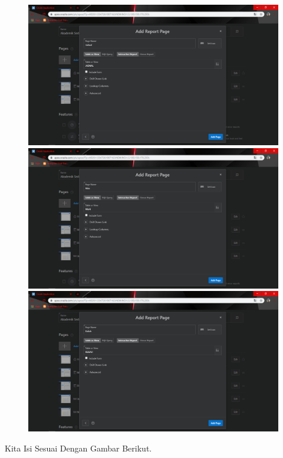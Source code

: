 \begin{enumerate}
\begin{figure}[!htbp]
    \begin{center}
    \includegraphics[scale=0.2]{figures/29.png}
    \includegraphics[scale=0.2]{figures/30.png}
    \includegraphics[scale=0.2]{figures/31.png}
    \end{center}   
    \end{figure}
    
\par
Kita Isi Sesuai Dengan Gambar Berikut.


\end{enumerate}

